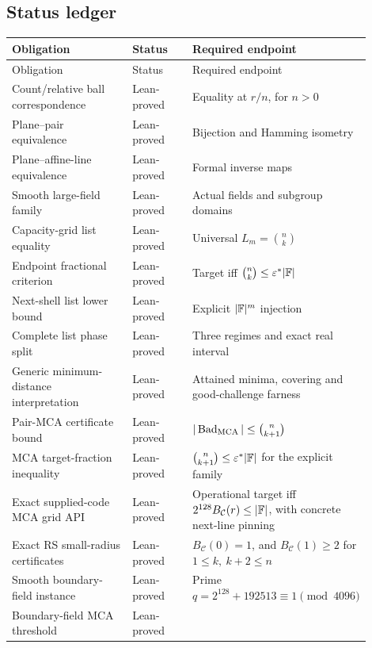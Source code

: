\subsection{Status ledger}

\begingroup
\small
\begin{longtable}{@{}>{\raggedright\arraybackslash}p{0.42\linewidth}
  >{\raggedright\arraybackslash}p{0.20\linewidth}
  >{\raggedright\arraybackslash}p{0.28\linewidth}@{}}
\toprule
Obligation & Status & Required endpoint\\
\midrule
\endfirsthead
\toprule
Obligation & Status & Required endpoint\\
\midrule
\endhead
Count/relative ball correspondence & Lean-proved & Equality at \(r/n\),
  for \(n>0\)\\
Plane--pair equivalence & Lean-proved & Bijection and Hamming isometry\\
Plane--affine-line equivalence & Lean-proved & Formal inverse maps\\
Smooth large-field family & Lean-proved & Actual fields and subgroup domains\\
Capacity-grid list equality & Lean-proved & Universal \(L_m=\binom nk\)\\
Endpoint fractional criterion & Lean-proved & Target iff
  \(\binom nk\le\varepsilon^\ast|\mathbb{F}|\)\\
Next-shell list lower bound & Lean-proved & Explicit \(|\mathbb{F}|^m\) injection\\
Complete list phase split & Lean-proved & Three regimes and exact real interval\\
Generic minimum-distance interpretation & Lean-proved & Attained minima,
  covering and good-challenge farness\\
Pair-MCA certificate bound & Lean-proved &
  \(|\operatorname{Bad}_{\operatorname{MCA}}|\le\binom n{k+1}\)\\
MCA target-fraction inequality & Lean-proved &
  \(\binom n{k+1}\le\varepsilon^\ast|\mathbb{F}|\) for the explicit family\\
Exact supplied-code MCA grid API & Lean-proved &
  Operational target iff \(2^{128}B_{\mathcal C}(r)\le|\mathbb{F}|\), with
  concrete next-line pinning\\
Exact RS small-radius certificates & Lean-proved &
  \(B_{\mathcal C}(0)=1\), and \(B_{\mathcal C}(1)\ge2\) for
  \(1\le k,\ k+2\le n\)\\
Smooth boundary-field instance & Lean-proved &
  Prime \(q=2^{128}+192513\equiv1\pmod {4096}\)\\
Boundary-field MCA threshold & Lean-proved &

\end{longtable}
